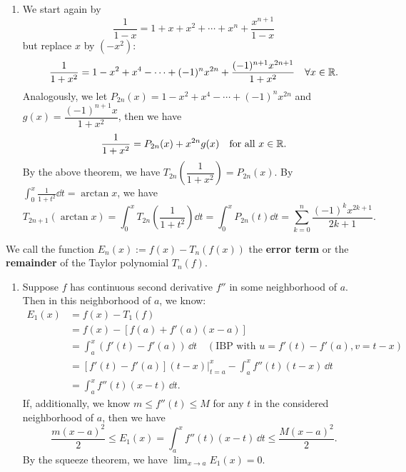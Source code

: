 \documentclass[a4paper]{ctexart}
\begin{document}
    \begin{myex}
        \begin{enumerate}[label=(\arabic*),start=7]
        \item We start again by
        \[
        \frac{1}{1-x} = 1 + x + x^2 + \cdots + x^n + \frac{x^{n+1}}{1-x}
        \]
        but replace $x$ by $(-x^2)$:
        \[
        \frac{1}{1+x^2} = 1 - x^2 + x^4 - \cdots + (-1)^n x^{2n} + \frac{(-1)^{n+1} x^{2n+1}}{1+x^2}\quad \forall x\in \mathbb{R}.
        \]
        Analogously, we let $P_{2n}(x) = 1 - x^2 + x^4 - \cdots + (-1)^n x^{2n}$ and $g(x) = \dfrac{(-1)^{n+1} x}{1+x^2}$, then we have
        \[
        \frac{1}{1+x^2} = P_{2n}(x) + x^{2n} g(x) \quad \text{for all } x\in \mathbb{R}.
        \]
        By the above theorem, we have $T_{2n}\left( \dfrac{1}{1+x^2} \right) = P_{2n}(x)$. By $\displaystyle \int_0^x \frac{1}{1+t^2} \dd t = \arctan x$, we have
        \[
        T_{2n+1}(\arctan x) = \int_0^x T_{2n}\left( \frac{1}{1+t^2} \right) \dd t = \int_0^x P_{2n}(t) \dd t = \sum_{k=0}^n \frac{(-1)^k x^{2k+1}}{2k+1}.
        \]
        \end{enumerate}
    \end{myex}
    \begin{mydef}
        We call the function $E_n(x) := f(x) - T_n(f(x))$ the \textbf{error term} or the \textbf{remainder} of the Taylor polynomial $T_n(f)$.
    \end{mydef}
    \begin{myex}
        \begin{enumerate}[label=(\arabic*),start=8]
            \item Suppose $f$ has continuous second derivative $f''$ in some neighborhood of $a$. Then in this neighborhood of $a$, we know:
            \[
            \begin{aligned}
                E_1(x) &= f(x) - T_1(f) \\
                &= f(x) - \left[ f(a) + f'(a)(x-a) \right] \\
                &= \int_a^x (f'(t) - f'(a))\, \dd t\quad (\text{IBP with } u=f'(t)-f'(a),v=t-x ) \\
                &= \left[ f'(t) - f'(a) \right](t-x)\Big|_{t=a}^x - \int_a^x f''(t)(t-x)\, \dd t\\
                &= \int_a^x f''(t)(x-t)\, \dd t.
            \end{aligned}
            \]
            If, additionally, we know $m\le f''(t) \le M$ for any $t$ in the considered neighborhood of $a$, then we have
            \[
            \frac{m(x-a)^2}{2} \le E_1(x) = \int_a^x f''(t)(x-t)\, \dd t \le \frac{M(x-a)^2}{2}.
            \]
            By the squeeze theorem, we have $\displaystyle \lim_{x\to a} E_1(x) = 0$.
        \end{enumerate}
    \end{myex}
\end{document}
